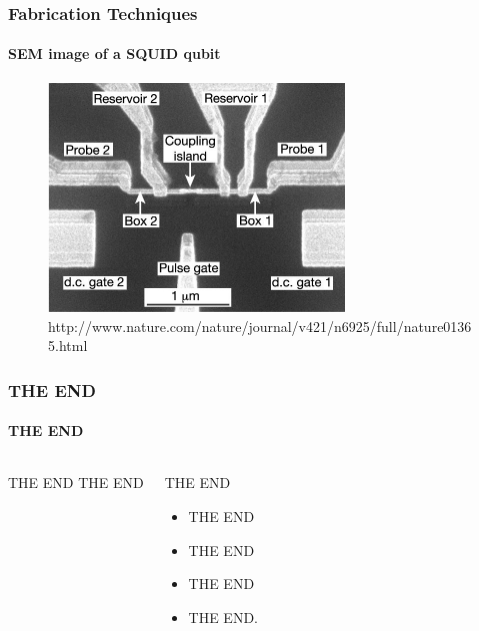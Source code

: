 \documentclass{beamer}
\begin{document}
\begin{frame}
    \frametitle{Fabrication Techniques}
    \framesubtitle{SEM image of a SQUID qubit}
    \begin{figure}[ht!]
        \centering
        \includegraphics[width=0.7\textwidth]{img/two-qubit-sem.jpg}
        \caption{http://www.nature.com/nature/journal/v421/n6925/full/nature01365.html}
    \end{figure}
\end{frame}


\begin{frame}
    \frametitle{THE END}
    \framesubtitle{THE END}
    \begin{columns}
            \begin{block}{THE END}
                THE END
            \end{block}
            \begin{block}{THE END}
                \begin{itemize}
                    \item THE END
                    \item THE END
                    \item THE END
                    \item THE END.
                \end{itemize}
            \end{block}
    \end{columns}
\end{frame}
\end{document}

